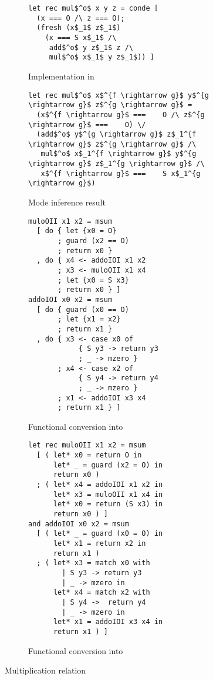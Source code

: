 \begin{figure*}[t]
  \centering
  \begin{subfigure}[b]{0.45\textwidth}
    \begin{lstlisting}[frame=tb]
let rec mul$^o$ x y z = conde [
  (x === O /\ z === O);
  (fresh (x$_1$ z$_1$)
    (x === S x$_1$ /\
     add$^o$ y z$_1$ z /\
     mul$^o$ x$_1$ y z$_1$)) ]
    \end{lstlisting}
    \caption{Implementation in \mk}
    \label{fig:mult_mk}
  \end{subfigure}
  \hfill
  \begin{subfigure}[b]{0.45\textwidth}
    \begin{lstlisting}[frame=tb]
let rec mul$^o$ x$^{f \rightarrow g}$ y$^{g \rightarrow g}$ z$^{g \rightarrow g}$ =
  (x$^{f \rightarrow g}$ ===    O /\ z$^{g \rightarrow g}$ ===    O) \/
  (add$^o$ y$^{g \rightarrow g}$ z$_1^{f \rightarrow g}$ z$^{g \rightarrow g}$ /\
   mul$^o$ x$_1^{f \rightarrow g}$ y$^{g \rightarrow g}$ z$_1^{g \rightarrow g}$ /\
   x$^{f \rightarrow g}$ ===    S x$_1^{g \rightarrow g}$)
    \end{lstlisting}
    \caption{Mode inference result}
    \label{fig:mult_modded}
  \end{subfigure}

  \hfill

  \begin{subfigure}[b]{0.45\textwidth}
    \begin{lstlisting}[frame=tb]
muloOII x1 x2 = msum
  [ do { let {x0 = O}
       ; guard (x2 == O)
       ; return x0 }
  , do { x4 <- addoIOI x1 x2
       ; x3 <- muloOII x1 x4
       ; let {x0 = S x3}
       ; return x0 } ]
addoIOI x0 x2 = msum
  [ do { guard (x0 == O)
       ; let {x1 = x2}
       ; return x1 }
  , do { x3 <- case x0 of
            { S y3 -> return y3
            ; _ -> mzero }
       ; x4 <- case x2 of
            { S y4 -> return y4
            ; _ -> mzero }
       ; x1 <- addoIOI x3 x4
       ; return x1 } ]
    \end{lstlisting}
    \caption{Functional conversion into \haskell}
    \label{fig:mult_haskell}
  \end{subfigure}
  \hfill
  \begin{subfigure}[b]{0.45\textwidth}
    \begin{lstlisting}[frame=tb]
let rec muloOII x1 x2 = msum
  [ ( let* x0 = return O in
      let* _ = guard (x2 = O) in
      return x0 )
  ; ( let* x4 = addoIOI x1 x2 in
      let* x3 = muloOII x1 x4 in
      let* x0 = return (S x3) in
      return x0 ) ]
and addoIOI x0 x2 = msum
  [ ( let* _ = guard (x0 = O) in
      let* x1 = return x2 in
      return x1 )
  ; ( let* x3 = match x0 with
        | S y3 -> return y3
        | _ -> mzero in
      let* x4 = match x2 with
        | S y4 ->  return y4
        | _ -> mzero in
      let* x1 = addoIOI x3 x4 in
      return x1 ) ]
    \end{lstlisting}
    \caption{Functional conversion into \ocaml}
    \label{fig:mult_ocaml}
  \end{subfigure}

  \caption{Multiplication relation}
  \label{fig:mult}
\end{figure*}
